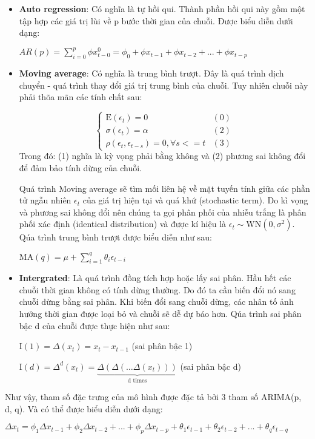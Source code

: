 \begin{itemize}
	\item \textbf{Auto regression}: Có nghĩa là tự hồi qui. Thành phần hồi qui này gồm một tập hợp các giá trị lùi về p bước thời gian của chuỗi. Được biểu diễn dưới dạng:
	\begin{center}
		$ AR(p) = \sum_{i=0}^{p} \phi x^0_{t-0} = \phi_0  + \phi x_{t-1} + \phi x_{t-2} + ... + \phi x_{t-p}$
	\end{center}
	\item \textbf{Moving average}: Có nghĩa là trung bình trượt. Đây là quá trình dịch chuyển - quá trình thay đổi giá trị trung bình của chuỗi. Tuy nhiên chuỗi này phải thõa mãn các tính chất sau:
	
	
	\begin{equation}
	\begin{cases}
	\text{E}(\epsilon_t) = 0 & (0)\\
	\sigma(\epsilon_t) = \alpha & (2)\\
	\rho(\epsilon_t, \epsilon_{t-s}) = 0, \forall s <= t & (3)
	\end{cases}       
	\end{equation}
	Trong đó: (1) nghĩa là kỳ vọng phải bằng không và (2) phương sai không đổi để đảm bảo tính dừng của chuỗi. 
	
	Quá trình Moving average sẽ tìm mối liên hệ về mặt tuyến tính giữa các phần tử ngẫu nhiên $ \epsilon_t $ của giá trị hiện tại và quá khứ (stochastic term). Do kì vọng và phương sai không đổi nên chúng ta gọi phân phối của nhiễu trắng là phân phối xác định (identical distribution) và được kí hiệu là $\epsilon_{t}\sim \text{WN}(0,\sigma^2) $. Qúa trình trung bình trượt được biểu diễn như sau:
	\begin{center}
		$ \text{MA}(q) = \mu+\sum_{i=1}^{q} \theta_i\epsilon_{t-i} $
	\end{center}

	\item \textbf{Intergrated}: Là quá trình đồng tích hợp hoặc lấy sai phân. Hầu hết các chuỗi thời gian không có tính dừng thường. Do đó ta cần biến đổi nó sang chuỗi dừng bằng sai phân. Khi biến đổi sang chuỗi dừng, các nhân tố ảnh hưởng thời gian được loại bỏ và chuỗi sẽ dễ dự báo hơn. Qúa trình sai phân bậc d của chuỗi được thực hiện như sau:
	\begin{center}
		$ \text{I}(1) = \Delta(x_t) = x_{t} - x_{t-1}$ (sai phân bậc 1)
		
		$ \text{I}(d) = \Delta^{d}(x_t) = \underbrace{\Delta(\Delta(\dots \Delta(x_t)))}_{\text{d times}} $ (sai phân bậc d)
	\end{center}
\end{itemize}


 Như vậy, tham số đặc trưng của mô hình được đặc tả bởi 3 tham số ARIMA(p, d, q). Và có thể được biểu diễn dưới dạng:
\begin{center}
	$ \Delta x_t = \phi_1 \Delta x_{t-1} +  \phi_2 \Delta x_{t-2} + ... +  \phi_p \Delta x_{t-p} + \theta_{1} \epsilon_{t-1} + \theta_{2} \epsilon_{t-2} + ... + \theta_{q} \epsilon_{t-q}
	$
\end{center}